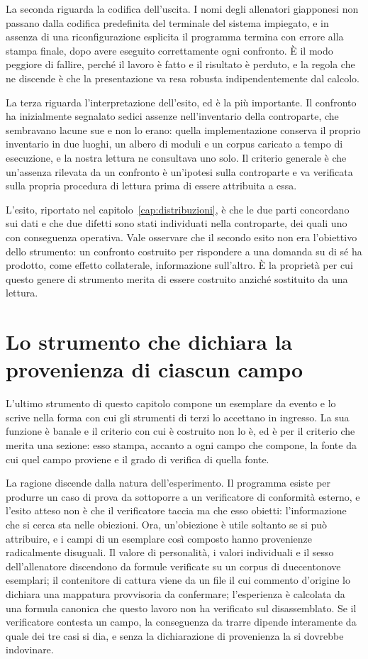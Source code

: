 La seconda riguarda la codifica dell'uscita. I nomi degli allenatori giapponesi non passano dalla codifica predefinita del terminale del sistema impiegato, e in assenza di una riconfigurazione esplicita il programma termina con errore alla stampa finale, dopo avere eseguito correttamente ogni confronto. È il modo peggiore di fallire, perché il lavoro è fatto e il risultato è perduto, e la regola che ne discende è che la presentazione va resa robusta indipendentemente dal calcolo.

La terza riguarda l'interpretazione dell'esito, ed è la più importante. Il confronto ha inizialmente segnalato sedici assenze nell'inventario della controparte, che sembravano lacune sue e non lo erano: quella implementazione conserva il proprio inventario in due luoghi, un albero di moduli e un corpus caricato a tempo di esecuzione, e la nostra lettura ne consultava uno solo. Il criterio generale è che un'assenza rilevata da un confronto è un'ipotesi sulla controparte e va verificata sulla propria procedura di lettura prima di essere attribuita a essa.

L'esito, riportato nel capitolo~\ref{cap:distribuzioni}, è che le due parti concordano sui dati e che due difetti sono stati individuati nella controparte, dei quali uno con conseguenza operativa. Vale osservare che il secondo esito non era l'obiettivo dello strumento: un confronto costruito per rispondere a una domanda su di sé ha prodotto, come effetto collaterale, informazione sull'altro. È la proprietà per cui questo genere di strumento merita di essere costruito anziché sostituito da una lettura.

\section{Lo strumento che dichiara la provenienza di ciascun campo}

L'ultimo strumento di questo capitolo compone un esemplare da evento e lo scrive nella forma con cui gli strumenti di terzi lo accettano in ingresso. La sua funzione è banale e il criterio con cui è costruito non lo è, ed è per il criterio che merita una sezione: esso stampa, accanto a ogni campo che compone, la fonte da cui quel campo proviene e il grado di verifica di quella fonte.

La ragione discende dalla natura dell'esperimento. Il programma esiste per produrre un caso di prova da sottoporre a un verificatore di conformità esterno, e l'esito atteso non è che il verificatore taccia ma che esso obietti: l'informazione che si cerca sta nelle obiezioni. Ora, un'obiezione è utile soltanto se si può attribuire, e i campi di un esemplare così composto hanno provenienze radicalmente disuguali. Il valore di personalità, i valori individuali e il sesso dell'allenatore discendono da formule verificate su un corpus di duecentonove esemplari; il contenitore di cattura viene da un file il cui commento d'origine lo dichiara una mappatura provvisoria da confermare; l'esperienza è calcolata da una formula canonica che questo lavoro non ha verificato sul disassemblato. Se il verificatore contesta un campo, la conseguenza da trarre dipende interamente da quale dei tre casi si dia, e senza la dichiarazione di provenienza la si dovrebbe indovinare.

